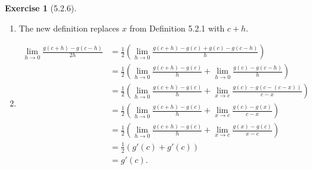 \documentclass{amsart}
\theoremstyle{definition}
\newtheorem{exercise}{Exercise}
\begin{document}
\begin{exercise}[5.2.6]
  \begin{enumerate}[label={(\alph*)}]
    \item The new definition replaces $x$ from Definition 5.2.1 with $c + h$.
    \item
      \begin{align*}
        \lim_{h \to 0} \frac{g(c + h) - g(c - h)}{2h} &= \frac{1}{2} \left(
        \lim_{h \to 0} \frac{g(c + h) - g(c) + g(c) - g(c - h)}{h} \right) \\
        &= \frac{1}{2} \left( \lim_{h \to 0} \frac{g(c + h) - g(c)}{h} + \lim_{h
        \to 0} \frac{g(c) - g(c - h)}{h} \right) \\
        &= \frac{1}{2} \left( \lim_{h \to 0} \frac{g(c + h) - g(c)}{h} + \lim_{x
        \to c} \frac{g(c) - g(c - (c - x))}{c - x} \right) \\
        &= \frac{1}{2} \left( \lim_{h \to 0} \frac{g(c + h) - g(c)}{h} + \lim_{x
        \to c} \frac{g(c) - g(x)}{c - x} \right) \\
        &= \frac{1}{2} \left( \lim_{h \to 0} \frac{g(c + h) - g(c)}{h} + \lim_{x
        \to c} \frac{g(x) - g(c)}{x - c} \right) \\
        &= \frac{1}{2} (g'(c) + g'(c)) \\
        &= g'(c).
      \end{align*}
  \end{enumerate}
\end{exercise}
\end{document}

